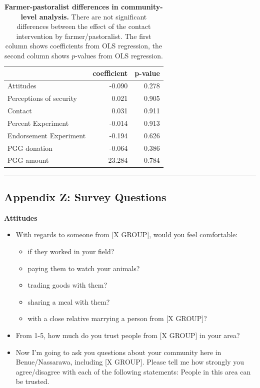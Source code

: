 \documentclass[
]{article}
\providecommand{\tightlist}{%
  \setlength{\itemsep}{0pt}\setlength{\parskip}{0pt}}
\begin{document}
\begin{table}[H]
\begin{center}
\label{tab:farm_tab}
\caption{\textbf{Farmer-pastoralist differences in community-level analysis.} There are not significant differences between the effect of the contact intervention by farmer/pastoralist. The first column shows coefficients from OLS regression, the second column shows $p$-values from OLS regression.}
\smallskip

\begin{tabular}{l|r|r}
\hline
  & coefficient & p-value\\
\hline
Attitudes & -0.090 & 0.278\\
\hline
Perceptions of security & 0.021 & 0.905\\
\hline
Contact & 0.031 & 0.911\\
\hline
Percent Experiment & -0.014 & 0.913\\
\hline
Endorsement Experiment & -0.194 & 0.626\\
\hline
PGG donation & -0.064 & 0.386\\
\hline
PGG amount & 23.284 & 0.784\\
\hline
\end{tabular}


\end{center}
\end{table}

\begin{center}\rule{0.5\linewidth}{0.5pt}\end{center}

\hypertarget{appendix-z-survey-questions}{%
\subsection{Appendix Z: Survey
Questions}\label{appendix-z-survey-questions}}

\textbf{Attitudes}

\begin{itemize}
\tightlist
\item
  With regards to someone from {[}X GROUP{]}, would you feel
  comfortable:

  \begin{itemize}
  \tightlist
  \item
    if they worked in your field?
  \item
    paying them to watch your animals?
  \item
    trading goods with them?
  \item
    sharing a meal with them?
  \item
    with a close relative marrying a person from {[}X GROUP{]}?
  \end{itemize}
\item
  From 1-5, how much do you trust people from {[}X GROUP{]} in your
  area?
\item
  Now I'm going to ask you questions about your community here in
  Benue/Nassarawa, including {[}X GROUP{]}. Please tell me how strongly
  you agree/disagree with each of the following statements: People in
  this area can be trusted.
\end{itemize}
\end{document}

